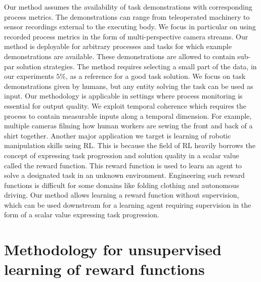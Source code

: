 \documentclass[\home/main.tex]{subfiles}
\begin{document}
Our method assumes the availability of task demonstrations with corresponding process metrics. The demonstrations can range from teleoperated machinery to sensor recordings external to the executing body. We focus in particular on using recorded process metrics in the form of multi-perspective camera streams. Our method is deployable for arbitrary processes and tasks for which example demonstrations are available. These demonstrations are allowed to contain sub-par solution strategies. The method requires selecting a small part of the data, in our experiments $5\%$, as a reference for a good task solution. We focus on task demonstrations given by humans, but any entity solving the task can be used as input. Our methodology is applicable in settings where process monitoring is essential for output quality. We exploit temporal coherence which requires the process to contain measurable inputs along a temporal dimension.
For example, multiple cameras filming how human workers are sewing the front and back of a shirt together.
Another major application we target is learning of robotic manipulation skills using RL. This is because the field of RL heavily borrows the concept of expressing task progression and solution quality in a scalar value called the reward function. This reward function is used to learn an agent to solve a designated task in an unknown environment. Engineering such reward functions is difficult for some domains like folding clothing and autonomous driving. Our method allows learning a reward function without supervision, which can be used downstream for a learning agent requiring supervision in the form of a scalar value expressing task progression.

\section{Methodology for unsupervised learning of reward functions}
\end{document}

